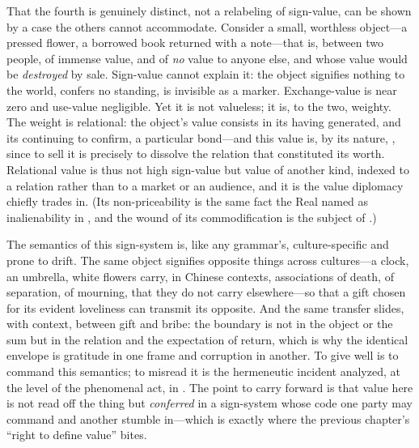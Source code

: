 That the fourth is genuinely distinct, not a relabeling of sign-value, can be shown by a case the others cannot accommodate. Consider a small, worthless object---a pressed flower, a borrowed book returned with a note---that is, between two people, of immense value, and of \emph{no} value to anyone else, and whose value would be \emph{destroyed} by sale. Sign-value cannot explain it: the object signifies nothing to the world, confers no standing, is invisible as a marker. Exchange-value is near zero and use-value negligible. Yet it is not valueless; it is, to the two, weighty. The weight is relational: the object's value consists in its having generated, and its continuing to confirm, a particular bond---and this value is, by its nature, , since to sell it is precisely to dissolve the relation that constituted its worth. Relational value is thus not high sign-value but value of another kind, indexed to a relation rather than to a market or an audience, and it is the value diplomacy chiefly trades in. (Its non-priceability is the same fact the Real named as inalienability in , and the wound of its commodification is the subject of .)

The semantics of this sign-system is, like any grammar's, culture-specific and prone to drift. The same object signifies opposite things across cultures---a clock, an umbrella, white flowers carry, in Chinese contexts, associations of death, of separation, of mourning, that they do not carry elsewhere---so that a gift chosen for its evident loveliness can transmit its opposite. And the same transfer slides, with context, between gift and bribe: the boundary is not in the object or the sum but in the relation and the expectation of return, which is why the identical envelope is gratitude in one frame and corruption in another. To give well is to command this semantics; to misread it is the hermeneutic incident analyzed, at the level of the phenomenal act, in . The point to carry forward is that value here is not read off the thing but \emph{conferred} in a sign-system whose code one party may command and another stumble in---which is exactly where the previous chapter's ``right to define value'' bites.

